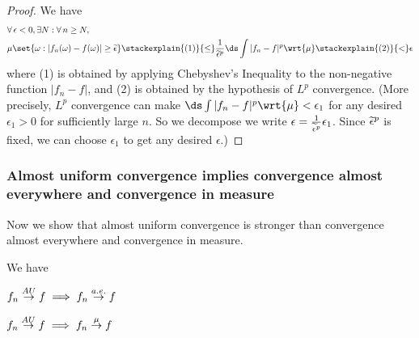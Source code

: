 \documentclass{article} %
\newcommand{\dint}{\ds\int}
\newcommand{\dmu}{\wrt{\mu}}
\begin{document}
\begin{proof}
We have
%
\begin{align*}
& \forall \, \epsilon < 0, \exists N : \forall \, n \geq N, \\
& \mu \set{\omega : |f_n (\omega) - f(\omega)| \geq \epsilontilde}  \stackexplain{(1)}{\leq} \frac{1}{\epsilontilde^p} \dint |f_n -f|^p \dmu \stackexplain{(2)}{<} \epsilon 	
\end{align*}
%
where (1) is obtained by applying Chebyshev's Inequality to the non-negative function $|f_n -f|$, and (2) is obtained by the hypothesis of $L^p$ convergence. {\tiny (More precisely,  $L^p$ convergence can make $\dint |f_n -f|^p \dmu  < \epsilon_1$ for any desired $\epsilon_1 >0$ for sufficiently large $n$.  So we decompose we write $\epsilon = \frac{1}{\widetilde{\epsilon}^p} \epsilon_1$.  Since $\widetilde{\epsilon}^p$ is fixed, we can choose $\epsilon_1$ to get any desired $\epsilon.$)} 
\end{proof}


\subsubsection{Almost uniform convergence implies convergence almost everywhere and convergence in measure} 

Now we show that almost uniform convergence is stronger than convergence almost everywhere and convergence in measure.
\begin{theorem}
We have
\begin{alphabate}
\item $f_n \stackrel{AU}{\to} f \implies f_n \stackrel{a.e.}{\to} f$
\item $f_n \stackrel{AU}{\to} f \implies f_n \stackrel{\mu}{\to} f$		
\end{alphabate}
\label{thm:convergence_AU_implies_convergence_in_measure_and_convergence_AE}
\end{theorem}
\end{document}

